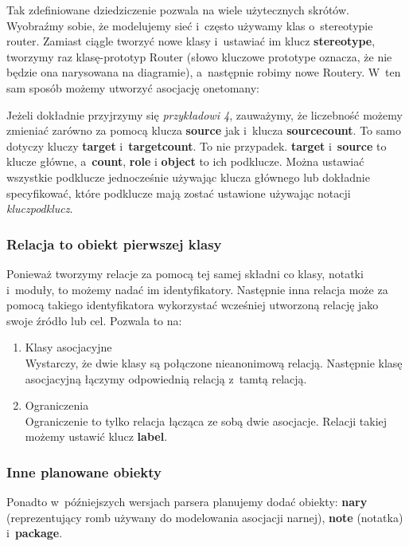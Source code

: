 \documentclass[a4paper, 11pt]{report}
\begin{document}
Tak zdefiniowane dziedziczenie pozwala na wiele użytecznych skrótów. Wyobraźmy sobie, że modelujemy
sieć i~często używamy klas o~stereotypie router. Zamiast ciągle tworzyć nowe klasy i~ustawiać im
klucz \textbf{stereotype}, tworzymy raz klasę-prototyp Router (słowo kluczowe prototype oznacza, że nie będzie
ona narysowana na diagramie), a~następnie robimy nowe Routery. W~ten sam sposób możemy utworzyć
asocjację one\dywiz to\dywiz many:



Jeżeli dokładnie przyjrzymy się \emph{przykładowi 4}, zauważymy, że liczebność możemy zmieniać
zarówno za pomocą klucza \textbf{source} jak i~klucza \textbf{source\dywiz count}. To samo dotyczy
kluczy \textbf{target} i~\textbf{target\dywiz count}. To nie przypadek. \textbf{target}
i~\textbf{source} to klucze główne, a~\textbf{count}, \textbf{role} i \textbf{object} to ich
podklucze. Można ustawiać wszystkie podklucze jednocześnie używając klucza głównego lub dokładnie
specyfikować, które podklucze mają zostać ustawione używając notacji \emph{klucz\dywiz podklucz}.

\subsubsection{Relacja to obiekt pierwszej klasy}
Ponieważ tworzymy relacje za pomocą tej samej składni co klasy, notatki i~moduły, to możemy nadać im
identyfikatory. Następnie inna relacja może za pomocą takiego identyfikatora wykorzystać wcześniej
utworzoną relację jako swoje źródło lub cel. Pozwala to na:
\begin{enumerate}
  \item{Klasy asocjacyjne} \\
    Wystarczy, że dwie klasy są połączone nieanonimową relacją. Następnie klasę asocjacyjną łączymy
    odpowiednią relacją z~tamtą relacją.
  \item{Ograniczenia} \\
    Ograniczenie to tylko relacja łącząca ze sobą dwie asocjacje. Relacji takiej możemy ustawić
    klucz \textbf{label}.
\end{enumerate}

\subsubsection{Inne planowane obiekty}
Ponadto w~późniejszych wersjach parsera planujemy dodać obiekty: \textbf{n\dywiz ary} (reprezentujący
romb używany do modelowania asocjacji n\dywiz arnej), \textbf{note} (notatka) i~\textbf{package}.
\end{document}
